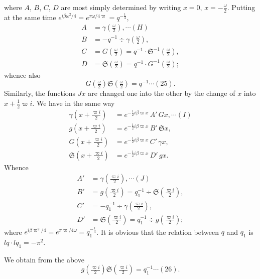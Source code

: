 \documentclass[12pt,a4paper]{article}
\newcommand{\fS}{\mathfrak{S}}
\begin{document}
\newpage
\setcounter{page}{142}

where $A$, $B$, $C$, $D$ are most simply determined by writing $x = 0$, $x = -\tfrac{\omega}{2}$. Putting at the same time $e^{i\beta\omega^2/4} = e^{\pi\omega/4\varpi} = q^{-\frac{1}{4}}$,
\begin{align*}
A &= \gamma\!\left(\tfrac{\omega}{2}\right), \cdots(H)\\
B &= -q^{-1} \div \gamma\!\left(\tfrac{\omega}{2}\right),\\
C &= G\!\left(\tfrac{\omega}{2}\right) = q^{-1}\cdot\fS^{-1}\!\!\left(\tfrac{\omega}{2}\right),\\
D &= \fS\!\left(\tfrac{\omega}{2}\right) = q^{-1}\cdot G^{-1}\!\!\left(\tfrac{\omega}{2}\right);
\end{align*}
whence also
\[
G\!\left(\tfrac{\omega}{2}\right)\fS\!\left(\tfrac{\omega}{2}\right) = q^{-1} \cdots(25).
\]
Similarly, the functions $J x$ are changed one into the other by the change of $x$ into $x + \tfrac{1}{2}\varpi i$. We have in the same way
\begin{align*}
\gamma\!\left(x + \tfrac{\varpi i}{2}\right) &= e^{-\frac{1}{2}i\beta\varpi x}\,A'\,G x, \cdots(I)\\
g\!\left(x + \tfrac{\varpi i}{2}\right) &= e^{-\frac{1}{2}i\beta\varpi x}\,B'\,\fS x,\\
G\!\left(x + \tfrac{\varpi i}{2}\right) &= e^{-\frac{1}{2}i\beta\varpi x}\,C'\,\gamma x,\\
\fS\!\left(x + \tfrac{\varpi i}{2}\right) &= e^{-\frac{1}{2}i\beta\varpi x}\,D'\,g x.
\end{align*}
Whence
\begin{align*}
A' &= \gamma\!\left(\tfrac{\varpi i}{2}\right), \cdots(J)\\
B' &= g\!\left(\tfrac{\varpi i}{2}\right) = q_1^{-1} \div \fS\!\left(\tfrac{\varpi i}{2}\right),\\
C' &= -q_1^{-1} \div \gamma\!\left(\tfrac{\varpi i}{2}\right),\\
D' &= \fS\!\left(\tfrac{\varpi i}{2}\right) = q_1^{-1} \div g\!\left(\tfrac{\varpi i}{2}\right);
\end{align*}
where $e^{i\beta\varpi^2/4} = e^{\pi\varpi/4\omega} = q_1^{-\frac{1}{4}}$. It is obvious that the relation between $q$ and $q_1$ is $lq\cdot lq_1 = -\pi^2$.

We obtain from the above
\[
g\!\left(\tfrac{\varpi i}{2}\right)\fS\!\left(\tfrac{\varpi i}{2}\right) = q_1^{-1} \cdots(26).
\]
\end{document}
